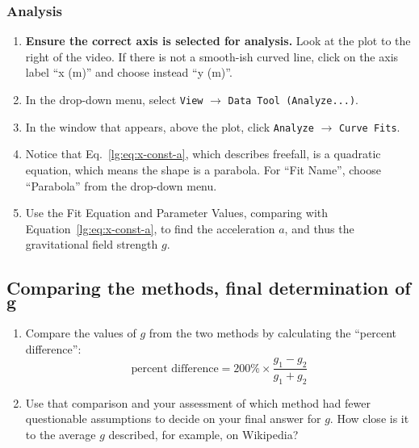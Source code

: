 \subsubsection{Analysis}

\begin{enumerate}
	\item \textbf{Ensure the correct axis is selected for analysis.} Look at the plot to the right of the video. If there is not a smooth-ish curved line, click on the axis label ``x (m)'' and choose instead ``y (m)''.
	
	\item In the drop-down menu, select \texttt{View} $\rightarrow$ \texttt{Data Tool (Analyze...)}.
	
	\item In the window that appears, above the plot, click \texttt{Analyze} $\rightarrow$ \texttt{Curve Fits}.
	
	\item Notice that Eq.~\ref{lg:eq:x-const-a}, which describes freefall, is a quadratic equation, which means the shape is a parabola. For ``Fit Name'', choose ``Parabola'' from the drop-down menu.
	
	\item Use the Fit Equation and Parameter Values, comparing with Equation~\ref{lg:eq:x-const-a}, to find the acceleration $a$, and thus the gravitational field strength $g$.
	
\end{enumerate}

\subsection{Comparing the methods, final determination of $\bm{g}$}

\begin{enumerate}
	\item Compare the values of $g$ from the two methods by calculating the ``percent difference'':
	\begin{equation}
	 \textrm{percent difference} = 200\% \times \frac{g_1 - g_2}{g_1 + g_2}
	\end{equation}
	
	\item Use that comparison and your assessment of which method had fewer questionable assumptions to decide on your final answer for $g$. How close is it to the average $g$ described, for example, on Wikipedia?
\end{enumerate}